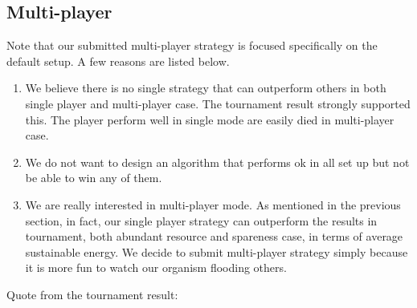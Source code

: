 \subsection{Multi-player}
Note that our submitted multi-player strategy is focused specifically on the default setup.
A few reasons are listed below.
\begin{enumerate}
  \item We believe there is no single strategy that can outperform others in both single player and multi-player case. The tournament result strongly supported this. The player perform well in single mode are easily died in multi-player case.
  \item We do not want to design an algorithm that performs ok in all set up but not be able to win any of them.
  \item We are really interested in multi-player mode. 
  As mentioned in the previous section, in fact, our single player strategy can outperform the results in tournament, both abundant resource and spareness case, in terms of average sustainable energy. We decide to submit multi-player strategy simply because it is more fun to watch our organism flooding others.
\end{enumerate}

Quote from the tournament result:

